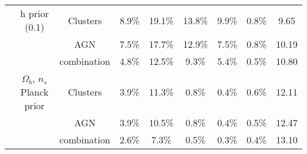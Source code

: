 \begin{tabular}{c|c|c|ccccc|c}
                                    & h prior (0.1) & Clusters &      8.9\% &     19.1\% &  13.8\% &   9.9\% &      0.8\% &   9.65 \\
                                    &                                & AGN &      7.5\% &     17.7\% &  12.9\% &   7.5\% &      0.8\% &  10.19 \\
                                    &                                & combination &      4.8\% &     12.5\% &   9.3\% &   5.4\% &      0.5\% &  10.80 \\
                                    & $\Omega_b$, $n_s$ Planck prior & Clusters &      3.9\% &     11.3\% &   0.8\% &   0.4\% &      0.6\% &  12.11 \\
                                    &                                & AGN &      3.9\% &     10.5\% &   0.8\% &   0.4\% &      0.5\% &  12.47 \\
                                    &                                & combination &      2.6\% &      7.3\% &   0.5\% &   0.3\% &      0.4\% &  13.10 \\
\bottomrule
\end{tabular}
